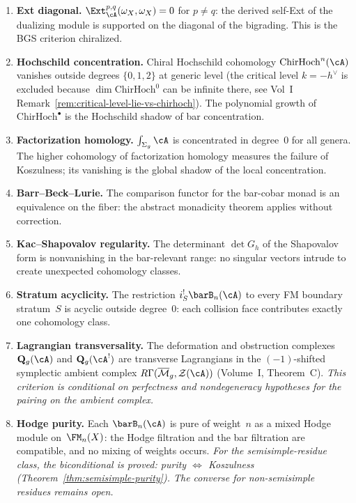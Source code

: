 \begin{theorem}
\begin{enumerate}[label=\textup{(\roman*)}]
\item \textbf{Ext diagonal.}
 $\Ext^{p,q}_\cA(\omega_X, \omega_X) = 0$ for $p \neq q$: the
 derived self-Ext of the dualizing module is supported on the diagonal
 of the bigrading. This is the BGS criterion chiralized.

\item \textbf{Hochschild concentration.}
 Chiral Hochschild cohomology $\mathrm{ChirHoch}^n(\cA)$ vanishes
 outside degrees $\{0, 1, 2\}$ at generic level (the critical level
 $k = -h^\vee$ is excluded because $\dim \mathrm{ChirHoch}^0$ can be
 infinite there, see Vol~I Remark~\ref*{rem:critical-level-lie-vs-chirhoch}).
 The polynomial growth of~$\mathrm{ChirHoch}^\bullet$ is the Hochschild
 shadow of bar concentration.

\item \textbf{Factorization homology.}
 $\int_{\Sigma_g} \cA$ is concentrated in degree~$0$ for all genera.
 The higher cohomology of factorization homology measures the failure
 of Koszulness; its vanishing is the global shadow of the local
 concentration.

\item \textbf{Barr--Beck--Lurie.}
 The comparison functor for the bar-cobar monad is an equivalence on
 the fiber: the abstract monadicity theorem applies without
 correction.

\item \textbf{Kac--Shapovalov regularity.}
 The determinant $\det G_h$ of the Shapovalov form is nonvanishing in
 the bar-relevant range: no singular vectors intrude to create
 unexpected cohomology classes.

\item \textbf{Stratum acyclicity.}
 The restriction $i_S^!\barB_n(\cA)$ to every FM boundary stratum~$S$
 is acyclic outside degree~$0$: each collision face contributes
 exactly one cohomology class.

\item \textbf{Lagrangian transversality.}
 The deformation and obstruction complexes $\mathbf{Q}_g(\cA)$ and
 $\mathbf{Q}_g(\cA^!)$ are transverse Lagrangians in the
 $(-1)$-shifted symplectic ambient complex
 $R\Gamma(\overline{\mathcal{M}}_g, \mathcal{Z}(\cA))$
 (Volume~I, Theorem~C).
 \emph{This criterion is conditional on perfectness and nondegeneracy
 hypotheses for the pairing on the ambient complex.}

\item \textbf{Hodge purity.}
 Each $\barB_n(\cA)$ is pure of weight~$n$ as a mixed Hodge module
 on~$\FM_n(X)$: the Hodge filtration and the bar filtration are
 compatible, and no mixing of weights occurs.
 \emph{For the semisimple-residue class,
 the biconditional is proved\textup{:}
 purity $\Leftrightarrow$ Koszulness
 \textup{(}Theorem~\textup{\ref{thm:semisimple-purity}).}
 The converse for non-semisimple residues remains open.}
\end{enumerate}
\end{theorem}

